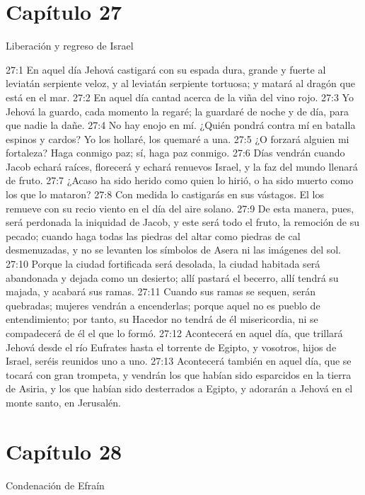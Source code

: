 \section*{Capítulo 27 }
Liberación y regreso de Israel 
 
27:1 En aquel día Jehová castigará con su espada dura, grande y fuerte al leviatán serpiente veloz, y al leviatán serpiente tortuosa; y matará al dragón que está en el mar. 
27:2 En aquel día cantad acerca de la viña del vino rojo. 
27:3 Yo Jehová la guardo, cada momento la regaré; la guardaré de noche y de día, para que nadie la dañe. 
27:4 No hay enojo en mí. ¿Quién pondrá contra mí en batalla espinos y cardos? Yo los hollaré, los quemaré a una. 
27:5 ¿O forzará alguien mi fortaleza? Haga conmigo paz; sí, haga paz conmigo. 
27:6 Días vendrán cuando Jacob echará raíces, florecerá y echará renuevos Israel, y la faz del mundo llenará de fruto. 
27:7 ¿Acaso ha sido herido como quien lo hirió, o ha sido muerto como los que lo mataron? 
27:8 Con medida lo castigarás en sus vástagos. El los remueve con su recio viento en el día del aire solano. 
27:9 De esta manera, pues, será perdonada la iniquidad de Jacob, y este será todo el fruto, la remoción de su pecado; cuando haga todas las piedras del altar como piedras de cal desmenuzadas, y no se levanten los símbolos de Asera ni las imágenes del sol. 
27:10 Porque la ciudad fortificada será desolada, la ciudad habitada será abandonada y dejada como un desierto; allí pastará el becerro, allí tendrá su majada, y acabará sus ramas. 
27:11 Cuando sus ramas se sequen, serán quebradas; mujeres vendrán a encenderlas; porque aquel no es pueblo de entendimiento; por tanto, su Hacedor no tendrá de él misericordia, ni se compadecerá de él el que lo formó. 
27:12 Acontecerá en aquel día, que trillará Jehová desde el río Eufrates hasta el torrente de Egipto, y vosotros, hijos de Israel, seréis reunidos uno a uno. 
27:13 Acontecerá también en aquel día, que se tocará con gran trompeta, y vendrán los que habían sido esparcidos en la tierra de Asiria, y los que habían sido desterrados a Egipto, y adorarán a Jehová en el monte santo, en Jerusalén. 
\section*{Capítulo 28 }
Condenación de Efraín 
 
